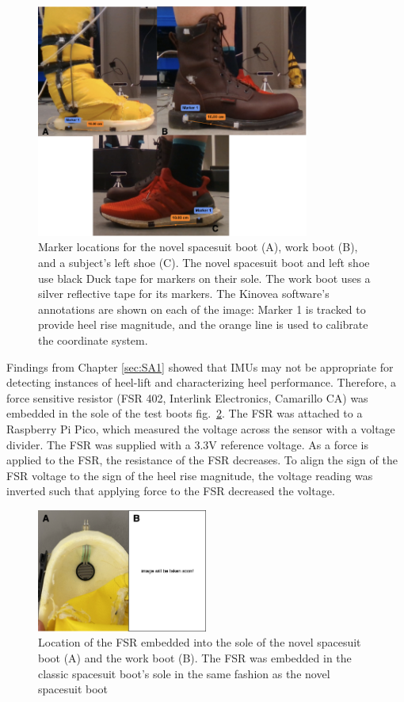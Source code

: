 \documentclass[defaultstyle,11pt]{thesis}
\begin{document}
\begin{figure}
\hypertarget{fig:SA4-Kinovea}{%
\centering
\includegraphics[width=0.8\textwidth,height=\textheight]{../fig/SA4/Kinovea.png}
\caption{Marker locations for the novel spacesuit boot (A), work boot (B), and a subject's left shoe (C). The novel spacesuit boot and left shoe use black Duck tape for markers on their sole. The work boot uses a silver reflective tape for its markers. The Kinovea software's annotations are shown on each of the image: Marker 1 is tracked to provide heel rise magnitude, and the orange line is used to calibrate the coordinate system.}\label{fig:SA4-Kinovea}
}
\end{figure}

Findings from Chapter \ref{sec:SA1} showed that IMUs may not be appropriate for detecting instances of heel-lift and characterizing heel performance.
Therefore, a force sensitive resistor (FSR 402, Interlink Electronics, Camarillo CA) was embedded in the sole of the test boots fig.~\ref{fig:SA4-FSRembed}.
The FSR was attached to a Raspberry Pi Pico, which measured the voltage across the sensor with a voltage divider.
The FSR was supplied with a 3.3V reference voltage.
As a force is applied to the FSR, the resistance of the FSR decreases.
To align the sign of the FSR voltage to the sign of the heel rise magnitude, the voltage reading was inverted such that applying force to the FSR decreased the voltage.

\begin{figure}
\hypertarget{fig:SA4-FSRembed}{%
\centering
\includegraphics[width=0.5\textwidth,height=\textheight]{../fig/SA4/FSR_embed.png}
\caption{Location of the FSR embedded into the sole of the novel spacesuit boot (A) and the work boot (B). The FSR was embedded in the classic spacesuit boot's sole in the same fashion as the novel spacesuit boot}\label{fig:SA4-FSRembed}
}
\end{figure}
\end{document}
